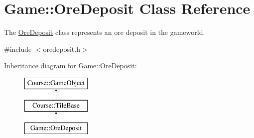 \hypertarget{classGame_1_1OreDeposit}{\section{Game\-:\-:Ore\-Deposit Class Reference}
\label{classGame_1_1OreDeposit}
}


The \hyperlink{classGame_1_1OreDeposit}{Ore\-Deposit} class represents an ore deposit in the gameworld.  




{\ttfamily \#include $<$oredeposit.\-h$>$}

Inheritance diagram for Game\-:\-:Ore\-Deposit\-:\begin{figure}[H]
\begin{center}
\leavevmode
\includegraphics[height=3.000000cm]{classGame_1_1OreDeposit}
\end{center}
\end{figure}
